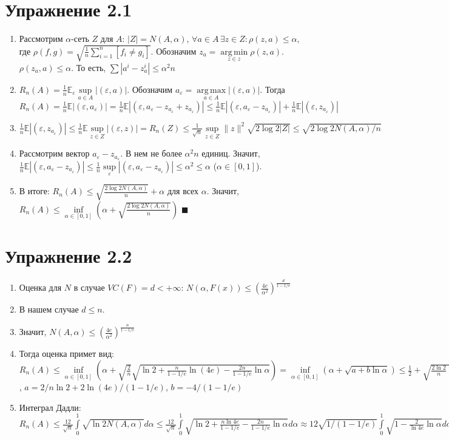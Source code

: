 \documentclass[a4paper]{article}
\DeclareMathOperator*{\argmin}{arg\,min}
\DeclareMathOperator*{\argmax}{arg\,max}
\newcommand{\E}{\mathbb{E}}
\def\eps{\varepsilon}
\begin{document}
\section*{Упражнение 2.1}
\begin{enumerate}
\item Рассмотрим $\alpha$-сеть $Z$ для $A$: $|Z|=N(A,\alpha)$, $\forall a\in A\,\exists z\in Z\colon \rho(z,a)\leqslant \alpha$, где $\rho(f,g)=\sqrt{\frac{1}{n}\sum\limits_{i=1}^n[f_i\neq g_i]}$. Обозначим $z_a=\argmin\limits_{z\in z}\rho(z, a)$. $\rho(z_a,a)\leqslant\alpha$. То есть, $\sum |a^i-z_a^i|\leqslant \alpha^2n$
\item $R_n(A)=\frac{1}{n}\E_\eps\sup\limits_{a\in A}|(\eps,a)|$. Обозначим $a_\eps=\argmax\limits_{a\in A}|(\eps,a)|$. Тогда $R_n(A)=\frac{1}{n}\E|(\eps,a_\eps)|=\frac{1}{n}\E|(\eps,a_\eps-z_{a_\eps}+z_{a_\eps})|\leqslant\frac{1}{n}\E|(\eps,a_\eps-z_{a_\eps})|+\frac{1}{n}\E|(\eps,z_{a_\eps})|$
\item $\frac{1}{n}\E |(\eps,z_{a_\eps})|\leqslant \frac{1}{n}\E\sup\limits_{z\in Z}|(\eps, z)|=R_n(Z)\leqslant \frac{1}{\sqrt{n}}\sup\limits_{z\in Z}\|z\|^2\sqrt{2\log 2|Z|}\leqslant\sqrt{2\log2 N(A,\alpha)/n}$
\item Рассмотрим вектор $a_\eps-z_{a_\eps}$. В нем не более $\alpha^2n$ единиц. Значит, $\frac{1}{n}\E |(\eps,a_\eps-z_{a_\eps})|\leqslant\frac{1}{n}\sup\limits_{\eps}|(\eps, a_\eps-z_{a_\eps})|\leqslant \alpha^2\leqslant \alpha$ ($\alpha\in[0,1]$).
\item В итоге: $R_n(A)\leqslant \sqrt{\frac{2\log 2N(A,\alpha)}{n}}+\alpha$ для всех $\alpha$. Значит, $R_n(A)\leqslant\inf\limits_{\alpha\in[0,1]}(\alpha+\sqrt{\frac{2\log2N(A,\alpha)}{n}})$ $\blacksquare$
\end{enumerate}
\section*{Упражнение 2.2}
\begin{enumerate}
\item Оценка для $N$ в случае $VC(F)=d<+\infty$: $N(\alpha, F(x))\leqslant \left(\frac{4e}{\alpha^2}\right) ^{\frac{d}{1-1/e}}$
\item В нашем случае $d\leqslant n$.
\item Значит, $N(A,\alpha)\leqslant\left(\frac{4e}{\alpha^2}\right)^{\frac{n}{1-1/e}}$
\item Тогда оценка примет вид: $R_n(A)\leqslant \inf\limits_{\alpha\in[0,1]}(\alpha+\sqrt{\frac{2}{n}}\sqrt{\ln2+\frac{n}{1-1/e}\ln(4e)-\frac{2n}{1-1/e}\ln\alpha})=\inf\limits_{\alpha\in[0,1]}(\alpha+\sqrt{a+b\ln\alpha})\leqslant \frac{1}{2}+\sqrt{\frac{2\ln 2}{n}+\frac{2}{1-1/e}(1+2\ln 2)}$, $a=2/n\ln2+2\ln(4e)/(1-1/e)$, $b=-4/(1-1/e)$
\item Интеграл Дадли: $R_n(A)\leqslant\frac{12}{\sqrt{n}}\int\limits_0^1\sqrt{\ln 2N(A,\alpha)}d\alpha\leqslant\frac{12}{\sqrt{n}}\int\limits_0^1\sqrt{\ln2+\frac{n\ln 4e}{1-1/e}-\frac{2n}{1-1/e}\ln\alpha}d\alpha\approx 12\sqrt{1/(1-1/e)}\int\limits_0^1\sqrt{1-\frac{2}{\ln 4e}\ln\alpha}d\alpha$
\end{enumerate}
\end{document}
